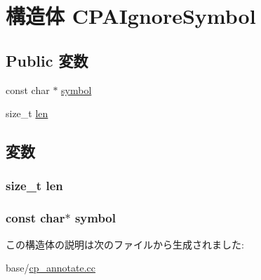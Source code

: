 \hypertarget{structCPAIgnoreSymbol}{
\section{構造体 CPAIgnoreSymbol}
\label{structCPAIgnoreSymbol}
}
\subsection*{Public 変数}
\begin{DoxyCompactItemize}
\item 
const char $\ast$ \hyperlink{structCPAIgnoreSymbol_ac32b11cac3faae6f478b0b81553f261a}{symbol}
\item 
size\_\-t \hyperlink{structCPAIgnoreSymbol_a7360b55975153b822efc5217b7734e6a}{len}
\end{DoxyCompactItemize}


\subsection{変数}
\hypertarget{structCPAIgnoreSymbol_a7360b55975153b822efc5217b7734e6a}{
\subsubsection[{len}]{\setlength{\rightskip}{0pt plus 5cm}size\_\-t {\bf len}}}
\label{structCPAIgnoreSymbol_a7360b55975153b822efc5217b7734e6a}
\hypertarget{structCPAIgnoreSymbol_ac32b11cac3faae6f478b0b81553f261a}{
\subsubsection[{symbol}]{\setlength{\rightskip}{0pt plus 5cm}const char$\ast$ {\bf symbol}}}
\label{structCPAIgnoreSymbol_ac32b11cac3faae6f478b0b81553f261a}


この構造体の説明は次のファイルから生成されました:\begin{DoxyCompactItemize}
\item 
base/\hyperlink{cp__annotate_8cc}{cp\_\-annotate.cc}\end{DoxyCompactItemize}
